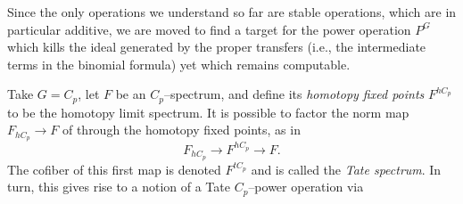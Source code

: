 Since the only operations we understand so far are stable operations, which are in particular additive, we are moved to find a target for the power operation \(P^G\) which kills the ideal generated by the proper transfers (i.e., the intermediate terms in the binomial formula) yet which remains computable.

\begin{definition}\label{DefnTateConstruction}
Take \(G = C_p\), let \(F\) be an \(C_p\)--spectrum, and define its \textit{homotopy fixed points} \(F^{hC_p}\) to be the homotopy limit spectrum.  It is possible to factor the norm map \(F_{hC_p} \to F\) of  through the homotopy fixed points, as in \[F_{hC_p} \to F^{hC_p} \to F.\]  The cofiber of this first map is denoted \(F^{tC_p}\) and is called the \textit{Tate spectrum}.  In turn, this gives rise to a notion of a Tate \(C_p\)--power operation via
\begin{center}
\end{center}
\end{definition}

